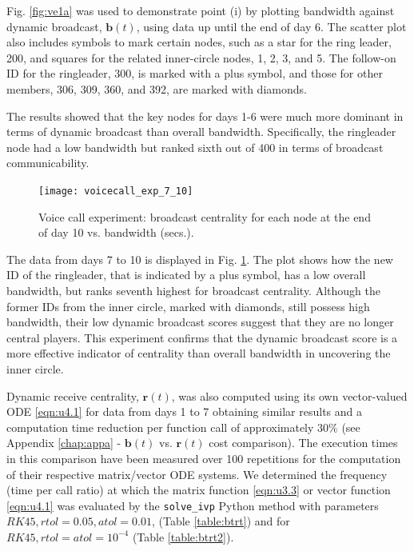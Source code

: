 Fig. \ref{fig:ve1a} was used to demonstrate point (i) by plotting bandwidth against dynamic broadcast, $\mathbf{b}(t)$, using data up until the end of day 6. The scatter plot also includes symbols to mark certain nodes, such as a star for the ring leader, 200, and squares for the related inner-circle nodes, 1, 2, 3, and 5. The follow-on ID for the ringleader, 300, is marked with a plus symbol, and those for other members, 306, 309, 360, and 392, are marked with diamonds.

The results showed that the key nodes for days 1-6 were much more dominant in terms of dynamic broadcast than overall bandwidth. Specifically, the ringleader node had a low bandwidth but ranked sixth out of 400 in terms of broadcast communicability.

\begin{figure}[h]\centering
    \texttt{[image: voicecall\_exp\_7\_10]}
    \caption{Voice call experiment: broadcast centrality for each node at the end of day 10 vs. bandwidth (secs.).}
    \label{fig:ve1b}
    \bigskip
\end{figure}

The data from days 7 to 10 is displayed in Fig. \ref{fig:ve1b}. The plot shows how the new ID of the ringleader, that is indicated by a plus symbol, has a low overall bandwidth, but ranks seventh highest for broadcast centrality. Although the former IDs from the inner circle, marked with diamonds, still possess high bandwidth, their low dynamic broadcast scores suggest that they are no longer central players. This experiment confirms that the dynamic broadcast score is a more effective indicator of centrality than overall bandwidth in uncovering the inner circle.

Dynamic receive centrality, $\mathbf{r}(t)$, was also computed using its own vector-valued ODE \eqref{eqn:u4.1} for data from days 1 to 7 obtaining similar results and a computation time reduction per function call of approximately $30\%$ (see Appendix \ref{chap:appa} - $\mathbf{b}(t)$ vs. $\mathbf{r}(t)$ cost comparison). The execution times in this comparison have been measured over 100 repetitions for the computation of their respective matrix/vector ODE systems. We determined the frequency (time per call ratio) at which the matrix function \eqref{eqn:u3.3} or vector function \eqref{eqn:u4.1} was evaluated by the \texttt{solve\_ivp} Python method with parameters $RK45, rtol=0.05, atol=0.01$, (Table \ref{table:btrt}) and for $RK45, rtol=atol=10^{-4}$ (Table \ref{table:btrt2}).

